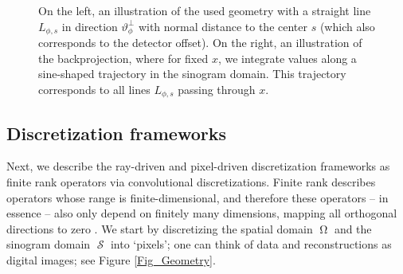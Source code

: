 \documentclass[11pt,reqno]{amsart}
\DeclareMathOperator{\imgdom}{\Omega}
\DeclareMathOperator{\sinodom}{\mathcal{S}}
\numberwithin{theorem}{section}
\theoremstyle{remark}
\begin{document}
\begin{figure}
 \hfill   {}

\caption{On the left, an illustration of the used geometry with a straight line $L_{\phi,s}$  in direction $\vartheta_\phi^\perp$ with normal distance to the center $s$ (which also corresponds to the detector offset). On the right, an illustration of the backprojection, where for fixed $x$, we integrate values along a sine-shaped trajectory in the sinogram domain. This trajectory corresponds to all lines $L_{\phi,s}$ passing through $x$.}	
\label{Fig_Radon_forward_and_backprojection_illustration}


\end{figure}




\subsection{Discretization frameworks}
\label{section_Radon_discretization}

Next, we describe the ray-driven and pixel-driven discretization frameworks as finite rank operators via convolutional discretizations. Finite rank describes operators whose range is finite-dimensional, and therefore these operators -- in essence -- also only depend on finitely many dimensions, mapping all orthogonal directions to zero \cite[II.4 Definition 4.3]{conway2019course}. 
We start by discretizing the spatial domain $\imgdom$ and the sinogram domain $\sinodom$ into `pixels'; one can think of data and reconstructions as digital images; see Figure \ref{Fig_Geometry}.
\end{document}
